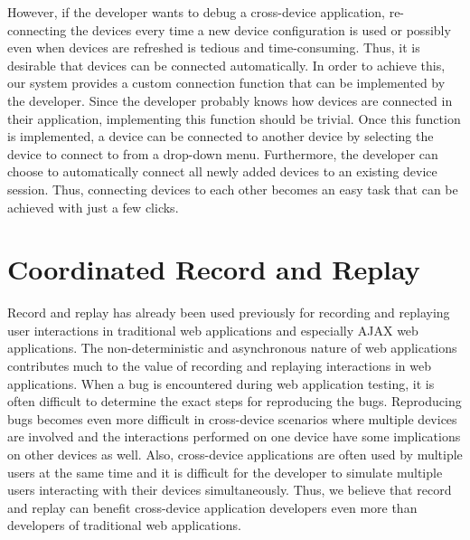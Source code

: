 However, if the developer wants to debug a cross-device application, re-connecting the devices every time a new device configuration is used or possibly even when devices are refreshed is tedious and time-consuming. Thus, it is desirable that devices can be connected automatically. In order to achieve this, our system provides a custom connection function that can be implemented by the developer. Since the developer probably knows how devices are connected in their application, implementing this function should be trivial. Once this function is implemented, a device can be connected to another device by selecting the device to connect to from a drop-down menu. Furthermore, the developer can choose to automatically connect all newly added devices to an existing device session. Thus, connecting devices to each other becomes an easy task that can be achieved with just a few clicks.

\section{Coordinated Record and Replay}

Record and replay has already been used previously for recording and replaying user interactions in traditional web applications and especially AJAX web applications. The non-deterministic and asynchronous nature of web applications contributes much to the value of recording and replaying interactions in web applications. When a bug is encountered during web application testing, it is often difficult to determine the exact steps for reproducing the bugs. Reproducing bugs becomes even more difficult in cross-device scenarios where multiple devices are involved and the interactions performed on one device have some implications on other devices as well. Also, cross-device applications are often used by multiple users at the same time and it is difficult for the developer to simulate multiple users interacting with their devices simultaneously. Thus, we believe that record and replay can benefit cross-device application developers even more than developers of traditional web applications.

